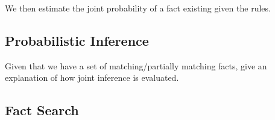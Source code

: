We then estimate the joint probability of a fact existing given the rules.













\subsection{Probabilistic Inference}
\label{sec:probqa-inference}
Given that we have a set of matching/partially matching facts, give an
explanation of how joint inference is evaluated.



\subsection{Fact Search}
\label{sec:probqa-search}

